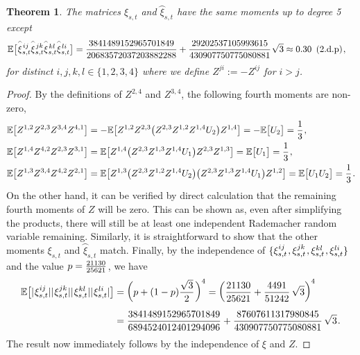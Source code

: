 \documentclass[sn-mathphys-num]{sn-jnl}%
\newtheorem{theorem}{Theorem}%
\newcommand{\E}{\mathbb{E}}
\newcommand{\m}{\hspace{0.25mm}}
\begin{document}
\begin{theorem}\label{thm:mismatch}The matrices $\xi_{s,t}$ and $\wideparen{\xi}_{s,t}$ have the same moments up to degree 5 except
\begin{align*}
\E\big[\m\wideparen{\xi}_{s,t}^{\m ij}\wideparen{\xi}_{s,t}^{\m jk}\wideparen{\xi}_{s,t}^{\m kl}\wideparen{\xi}_{s,t}^{\m li}\big] & = \frac{3841489152965701849}{20683572037203882288} + \frac{29202537105993615}{430907750775080881}\m\sqrt{3}\approx 0.30\,\,\,(\text{2.d.p})\m,
\end{align*}
for distinct $i,j,k,l\in\{1,2,3,4\}$ where we define $Z^{ji} := -Z^{ij}$ for $i > j$.
\end{theorem}
\begin{proof}
By the definitions of $Z^{2,4}$ and $Z^{3,4}$, the following fourth moments are non-zero,
\begin{align*}
\E\big[Z^{1,2}Z^{2,3}Z^{3,4}Z^{4,1}\big]
& = -\E\big[Z^{1,2}Z^{2,3}\big(Z^{2,3}Z^{1,2}Z^{1,4}U_2\big)Z^{1,4}\big] = -\E\big[U_2\big] = \frac{1}{3}\m,\\
\E\big[Z^{1,4}Z^{4,2}Z^{2,3}Z^{3,1}\big]
& = \E\big[Z^{1,4}\big(Z^{2,3}Z^{1,3}Z^{1,4}U_1\big)Z^{2,3}Z^{1,3}\big] = \E\big[U_1\big] = \frac{1}{3}\m,\\
\E\big[Z^{1,3}Z^{3,4}Z^{4,2}Z^{2,1}\big] & = \E\big[Z^{1,3} \big(Z^{2,3}Z^{1,2}Z^{1,4} U_2\big)\big(Z^{2,3}Z^{1,3}Z^{1,4}U_1\big)Z^{1,2}\big] = \E\big[U_1 U_2\big] = \frac{1}{3}\m.
\end{align*}
On the other hand, it can be verified by direct calculation that the remaining fourth moments of $Z$ will be zero. This can be shown as, even after simplifying the products, there will still be at least one independent Rademacher random variable remaining.
Similarly, it is straightforward to show that the other moments $\xi_{s,t}$ and $\wideparen{\xi}_{s,t}$ match.
Finally, by the independence of $\{\xi_{s,t}^{ij}\m, \xi_{s,t}^{jk}\m, \xi_{s,t}^{kl}\m, \xi_{s,t}^{li}\}$ and the value $p = \frac{21130}{25621}\m$, we have
\begin{align*}
\E\big[|\m\xi_{s,t}^{ij}||\m\xi_{s,t}^{jk}||\m\xi_{s,t}^{kl}||\m\xi_{s,t}^{li}|\big] & = \bigg(p + (1-p)\frac{\sqrt{3}}{2}\m\bigg)^4 = \bigg(\frac{21130}{25621} + \frac{4491}{51242}\,\sqrt{3}\bigg)^4\\[3pt]
& = \frac{3841489152965701849}{6894524012401294096} + \frac{87607611317980845}{430907750775080881}\,\sqrt{3}\m.
\end{align*}
The result now immediately follows by the independence of $\xi$ and $Z$.
\end{proof}\medbreak
\end{document}
